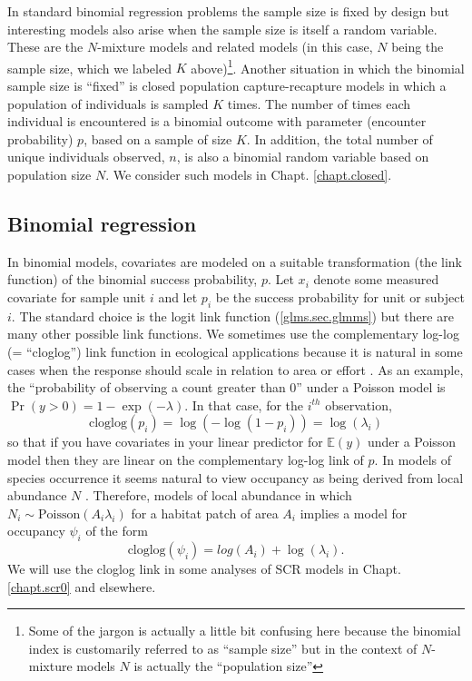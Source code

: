 {{ In standard binomial regression problems the sample size
is fixed by design but interesting models also arise when the sample
size is itself a random variable. These are the $N$-mixture models
\citep{royle:2004biom, kery_etal:2005, royle_dorazio:2008, kery:2010}
and related models (in this case, $N$ being the sample size,
which we labeled $K$ above)\footnote{Some of the jargon is actually a little
bit confusing here
because the binomial index is customarily referred to as ``sample size''
but in the context of $N$-mixture models $N$ is actually the
``population size''}.
Another
situation in which the binomial sample size is ``fixed'' is closed
population capture-recapture models in which a population of
individuals is sampled $K$ times.  The number of times each individual
is encountered is a binomial outcome with parameter (encounter
probability) $p$, based on a sample of size $K$.  In addition, the
total number of unique individuals observed, $n$, is also a binomial
random variable based on population size $N$.  We consider such
models in Chapt. \ref{chapt.closed}.


\subsection{Binomial regression}

In binomial models, covariates are modeled on a suitable
transformation (the link function) of the binomial success
probability, $p$.  Let $x_{i}$ denote some measured covariate for
sample unit $i$ and let $p_{i}$ be the success probability for unit or
subject $i$.
The standard choice is the logit link function (\ref{glms.sec.glmms})
but there are many other possible link functions. 
We sometimes use the
complementary log-log (= ``cloglog'') link function in ecological
applications because it is natural in some cases when the response
should scale in relation to area or effort
\citep[][p. 150]{royle_dorazio:2008}. As an example, the
``probability of observing a count greater than 0'' under a Poisson
model is $\Pr(y>0) = 1-\exp(- \lambda)$. In that case, for the
$i^{th}$ observation,
\[
\mbox{cloglog}(p_{i}) = \log(- \log(1-p_{i})) = \log(\lambda_{i})
\]
so that if you have covariates in your linear predictor for $\mathbb{E}(y)$
under a Poisson model then they are linear on the complementary
log-log link of $p$.
In models of species occurrence it seems natural to view occupancy as
being derived from local abundance $N$
\citep{royle_nichols:2003,royle_dorazio:2006,dorazio:2007}.
Therefore,
models of local abundance in which $N_{i} \sim \mbox{Poisson}(A_{i} \lambda_{i})$
for a habitat patch of area $A_{i}$ implies a model for occupancy $\psi_{i}$
of the form
\[
 \mbox{cloglog}(\psi_{i}) = log(A_{i}) + \log(\lambda_{i}).
\]
We will use the cloglog link in some analyses of
SCR models in Chapt. \ref{chapt.scr0} and elsewhere.


}}
